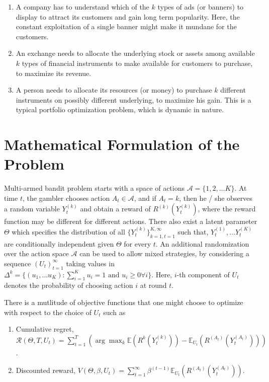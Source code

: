 \documentclass[11pt]{article}
\newcommand{\E}{\mathbb{E}}
\newcommand{\Acal}{\mathcal{A}}
\begin{document}
\begin{enumerate}
    \item A company has to understand which of the $k$ types of ads (or banners) to display to attract its customers and gain long term popularity. Here, the constant exploitation of a single banner might make it mundane for the customers.
    \item An exchange needs to allocate the underlying stock or assets among available $k$ types of financial instruments to make available for customers to purchase, to maximize its revenue.
    \item A person needs to allocate its resources (or money) to purchase $k$ different instruments on possibly different underlying, to maximize his gain. This is a typical portfolio optimization problem, which is dynamic in nature.
\end{enumerate}

\section{Mathematical Formulation of the Problem}

Multi-armed bandit problem starts with a space of actions $\Acal = \{ 1, 2, \dots K \}$. At time $t$, the gambler chooses action $A_t \in \Acal$, and if $A_t = k$, then he / she observes a random variable $Y_t^{(k)}$ and obtain a reward of $R^{(k)}(Y_t^{(k)})$, where the reward function may be different for different actions. There also exist a latent parameter $\Theta$ which specifies the distribution of all $\{ Y_t^{(k)} \}_{k=1, t=1}^{K, \infty}$ such that, $Y_t^{(1)}, \dots Y_t^{(K)}$ are conditionally independent given $\Theta$ for every $t$. An additional randomization over the action space $\Acal$ can be used to allow mixed strategies, by considering a sequence $(U_t)_{t=1}^{\infty}$ taking values in $\Delta^k = \{ (u_1, \dots u_K) : \sum_{i=1}^K u_i = 1 \text{ and } u_i \geq 0 \forall i \}$. Here, $i$-th component of $U_t$ denotes the probability of choosing action $i$ at round $t$.

There is a mutlitude of objective functions that one might choose to optimize with respect to the choice of $U_t$ such as

\begin{enumerate}
    \item Cumulative regret, $\mathcal{R}(\Theta, T, U_t) = \sum_{t=1}^{T} \left( \arg\max_k \E(R^{k}(Y_t^{(k)})) - \E_{U_t}(R^{(A_t)}(Y_t^{(A_t)})) \right)$.
    \item Discounted reward, $V(\Theta, \beta, U_t) = \sum_{t=1}^\infty \beta^{(t-1)}\E_{U_t}(R^{(A_t)}(Y_t^{(A_t)}))$.
\end{enumerate}
\end{document}
